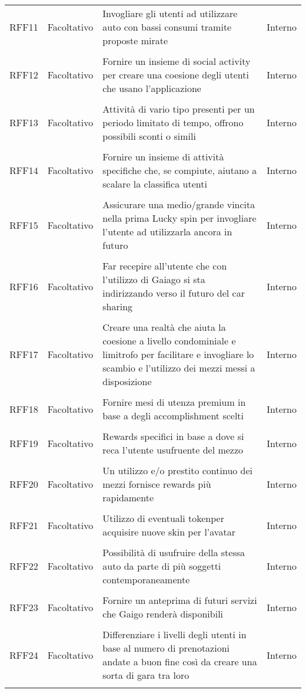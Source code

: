 \begin{longtable}{ >{\centering}p{} >{\centering}p{}
		>{\raggedright}p{} >{\centering}p{}}
	RFF11	&	Facoltativo	&	Invogliare gli utenti ad utilizzare auto con bassi consumi tramite proposte mirate &	Interno  \\ 	\tabularnewline
	RFF12	&	Facoltativo	&	Fornire un insieme di social activity per creare una coesione degli utenti che usano l'applicazione &	Interno  \\ 	\tabularnewline
	RFF13	&	Facoltativo	&	Attività di vario tipo presenti per un periodo limitato di tempo, offrono possibili sconti o simili &	Interno  \\	\tabularnewline
	RFF14	&	Facoltativo	& Fornire un insieme di attività specifiche che, se compiute, aiutano a scalare la classifica utenti &	Interno  \\ 	\tabularnewline
	RFF15	&	Facoltativo	& Assicurare una medio/grande vincita nella prima Lucky spin per invogliare l'utente ad utilizzarla ancora in futuro &	Interno  \\ 	\tabularnewline
	RFF16	&	Facoltativo	& Far recepire all'utente che con l'utilizzo di Gaiago si sta indirizzando verso il futuro del car sharing &	Interno  \\ 	\tabularnewline
	RFF17	&	Facoltativo	& Creare una realtà che aiuta la coesione a livello condominiale e limitrofo per facilitare e invogliare lo scambio e l'utilizzo dei mezzi messi a disposizione &	Interno  \\ 	\tabularnewline
	RFF18	&	Facoltativo	& Fornire mesi di utenza premium in base a degli accomplishment scelti &	Interno  \\ 	\tabularnewline
	RFF19	&	Facoltativo	& Rewards specifici in base a dove si reca l'utente usufruente del mezzo &	Interno  \\ 	\tabularnewline
	RFF20	&	Facoltativo	& Un utilizzo e/o prestito continuo dei mezzi fornisce rewards più rapidamente &	Interno  \\ 	\tabularnewline
	RFF21	&	Facoltativo	& Utilizzo di eventuali token\glosp per acquisire nuove skin per l'avatar  &	Interno  \\ 	\tabularnewline
	RFF22	&	Facoltativo	& Possibilità di usufruire della stessa auto da parte di più soggetti contemporaneamente  &	Interno  \\ 	\tabularnewline
	RFF23	&	Facoltativo	& Fornire un anteprima di futuri servizi che Gaigo renderà disponibili  &	Interno  \\ 	\tabularnewline
	RFF24	&	Facoltativo	& Differenziare i livelli degli utenti in base al numero di prenotazioni andate a buon fine così da creare una sorta di gara tra loro  &	Interno  \\ 	\tabularnewline
\end{longtable}

